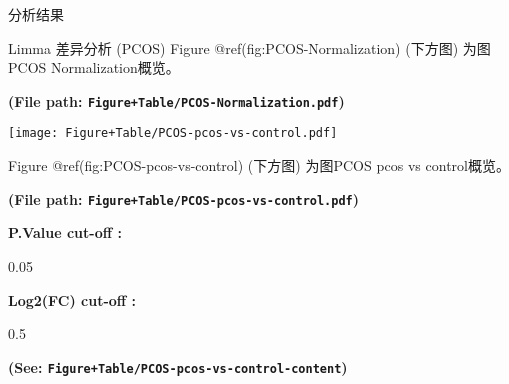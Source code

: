 \documentclass[
  ignorenonframetext,
]{beamer}
\begin{document}
\begin{frame}[fragile]{分析结果}
\begin{block}{Limma 差异分析 (PCOS)}
Figure @ref(fig:PCOS-Normalization) (下方图) 为图PCOS
Normalization概览。

\textbf{(File path: \texttt{Figure+Table/PCOS-Normalization.pdf})}

\begin{center}\vspace{1.5cm}\end{center}

\begin{center}\vspace{1.5cm}\end{center}
\def\@captype{figure}
\begin{center}
\texttt{[image: Figure+Table/PCOS-pcos-vs-control.pdf]}
\caption{PCOS pcos vs control}\label{fig:PCOS-pcos-vs-control}
\end{center}

Figure @ref(fig:PCOS-pcos-vs-control) (下方图) 为图PCOS pcos vs
control概览。

\textbf{(File path: \texttt{Figure+Table/PCOS-pcos-vs-control.pdf})}

\begin{center}\vspace{1.5cm}\end{center}\begin{center}\begin{tcolorbox}[colback=gray!10, colframe=gray!50, width=0.9\linewidth, arc=1mm, boxrule=0.5pt]
\textbf{
P.Value cut-off
:}

\vspace{0.5em}

    0.05

\vspace{2em}


\textbf{
Log2(FC) cut-off
:}

\vspace{0.5em}

    0.5

\vspace{2em}
\end{tcolorbox}
\end{center}

\textbf{(See: \texttt{Figure+Table/PCOS-pcos-vs-control-content})}

\begin{center}\vspace{1.5cm}\end{center}


\end{block}
\end{frame}
\end{document}
